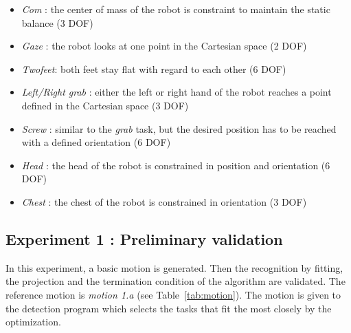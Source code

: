 \documentclass[journal]{IEEEtran}
\begin{document}
\begin{itemize}
  \item \emph{Com} : the center of mass of the robot is constraint to maintain the static balance (3 DOF)
  \item \emph{Gaze} : the robot looks at one point in the Cartesian space (2 DOF)
  \item \emph{Twofeet}: both feet stay flat with regard to each other (6 DOF)
  \item \emph{Left/Right grab} : either the left or right hand
of the robot reaches a point defined in the Cartesian space (3 DOF)
  \item \emph{Screw} : similar to the \emph{grab} task, but the desired position
has to be reached with a defined orientation (6 DOF)
  \item \emph{Head} : the head of the robot is constrained in position and orientation (6 DOF)
  \item \emph{Chest} : the chest of the robot is constrained in orientation  (3 DOF)
\end{itemize}

\subsection{Experiment 1 : Preliminary validation}
\label{sec:prelimValid}
In this experiment, a basic motion is generated. Then the recognition by fitting, the projection
and the termination condition of the algorithm are validated.
The reference motion is \emph{motion 1.a} (see Table~\ref{tab:motion}).
The motion is given to the detection program
which selects the tasks that fit the most closely by the optimization.
\end{document}
